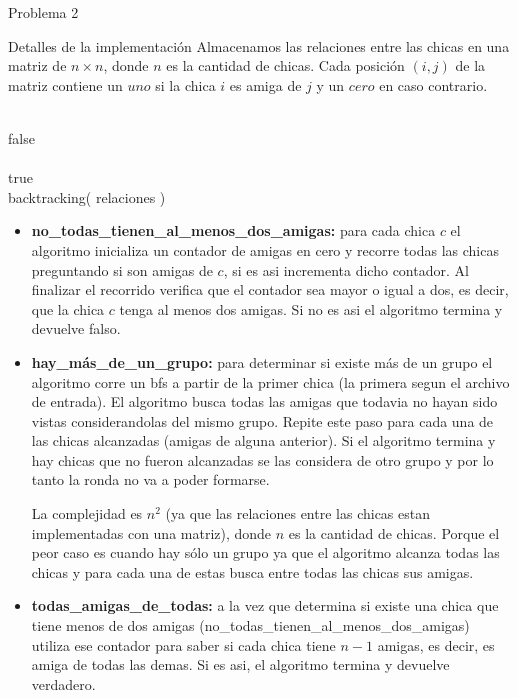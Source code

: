 \begin{section}{Problema 2}
\begin{subsection}{Detalles de la implementación}
		Almacenamos las relaciones entre las chicas en una matriz de $n \times n$, donde $n$ es la cantidad de chicas. Cada posición $(i,j)$ de la matriz contiene un $uno$ si la chica $i$ es amiga de $j$ y un $cero$ en caso contrario.\VSP

		\begin{pseudo}
			\tab{} \\
			\tab\tab \RET false \\
			\tab{} \\
			\tab\tab \RET true \\
			\tab backtracking( relaciones )
		\end{pseudo}

		\begin{itemize}
			\item \textbf{no\_todas\_tienen\_al\_menos\_dos\_amigas:} para cada chica $c$ el algoritmo inicializa un contador de amigas en cero y recorre todas las chicas preguntando si son amigas de $c$, si es asi incrementa dicho contador. Al finalizar el recorrido verifica que el contador sea mayor o igual a dos, es decir, que la chica $c$ tenga al menos dos amigas. Si no es asi el algoritmo termina y devuelve falso.

			\item \textbf{hay\_más\_de\_un\_grupo:} para determinar si existe más de un grupo el algoritmo corre un bfs a partir de la primer chica (la primera segun el archivo de entrada). El algoritmo busca todas las amigas que todavia no hayan sido vistas considerandolas del mismo grupo. Repite este paso para cada una de las chicas alcanzadas (amigas de alguna anterior). Si el algoritmo termina y hay chicas que no fueron alcanzadas se las considera de otro grupo y por lo tanto la ronda no va a poder formarse.

La complejidad es $n^2$ (ya que las relaciones entre las chicas estan implementadas con una matriz), donde $n$ es la cantidad de chicas. Porque el peor caso es cuando hay sólo un grupo ya que el algoritmo alcanza todas las chicas y para cada una de estas busca entre todas las chicas sus amigas.

		\item \textbf{todas\_amigas\_de\_todas:} a la vez que determina si existe una chica que tiene menos de dos amigas (no\_todas\_tienen\_al\_menos\_dos\_amigas) utiliza ese contador para saber si cada chica tiene $n-1$ amigas, es decir, es amiga de todas las demas. Si es asi, el algoritmo termina y devuelve verdadero.


\end{itemize}
\end{subsection}
\end{section}
